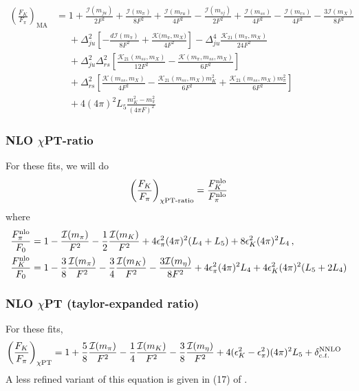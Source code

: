 \documentclass[prd,tightenlines,preprintnumbers,showpacs,superscriptaddress,notitlepage,eqsecnum,floatfix,notitlepage]{revtex4-1}
\begin{document}
\begin{align}\label{eq:fkfpi_ma}
\left(\frac{F_K}{F_\pi}\right)_\text{MA} &= 1
+\frac{\mathcal{I}(m_{ju})}{2F^2}
+\frac{\mathcal{I}(m_\pi)}{8F^2}
+\frac{\mathcal{I}(m_{ru})}{4F^2}
-\frac{\mathcal{I}(m_{sj})}{2F^2}
+\frac{\mathcal{I}(m_{ss})}{4F^2}
-\frac{\mathcal{I}(m_{rs})}{4F^2}
-\frac{3\mathcal{I}(m_X)}{8F^2}
\nonumber\\&\phantom{=}
+\Delta_{ju}^2 \left[ -\frac{d\mathcal{I}(m_\pi)}{8F^2} + \frac{\mathcal{K(}m_\pi,m_X)}{4F^2} \right]
-\Delta_{ju}^4 \frac{\mathcal{K}_{21}(m_\pi,m_X)}{24 F^2}
\nonumber\\&\phantom{=}
+\Delta_{ju}^2\Delta_{rs}^2 \left[ \frac{\mathcal{K}_{21}(m_{ss},m_X)}{12F^2}
-\frac{\mathcal{K}(m_\pi, m_{ss}, m_X)}{6F^2}
 \right]
\nonumber\\&\phantom{=}
+\Delta_{rs}^2 \left[
\frac{\mathcal{K}(m_{ss},m_X)}{4F^2}
-\frac{\mathcal{K}_{21}(m_{ss},m_X) m_K^2}{6F^2}
+\frac{\mathcal{K}_{21}(m_{ss},m_X) m_\pi^2}{6F^2}
\right]
\nonumber\\&\phantom{=}
+ 4 (4\pi)^2 L_5 \frac{m_K^2 - m_\pi^2}{(4\pi F)^2}
\end{align}

\subsubsection{NLO $\chi$PT-ratio}
For these fits, we will do
\begin{equation}
\left(\frac{F_K}{F_\pi}\right)_\text{$\chi$PT-ratio} = \frac{F_K^{\rm nlo}}{F_\pi^{\rm nlo}}
\end{equation}
where
\begin{align}
\frac{F_\pi^{\rm nlo}}{F_0} &= 1
- \frac{\mathcal{I}(m_\pi)}{F^2}
-\frac{1}{2}\frac{\mathcal{I}(m_K)}{F^2}
+4 \epsilon_\pi^2 (4\pi)^2 (L_4 + L_5)
+8 \epsilon_K^2 (4\pi)^2 L_4 \, , \\
\frac{F_K^{\rm nlo}}{F_0} &= 1
-\frac{3}{8}\frac{\mathcal{I}(m_\pi)}{F^2}
-\frac{3}{4}\frac{\mathcal{I}(m_K)}{F^2}
-\frac{3\mathcal{I}(m_\eta)}{8F^2}
+4\epsilon_\pi^2 (4 \pi)^2  L_4 + 4\epsilon_K^2 (4 \pi)^2  (L_5 + 2L_4)
\end{align}


\subsubsection{NLO $\chi$PT (taylor-expanded ratio)}
For these fits,
\begin{align}\label{eq:fkfpi_chpt}
\left(\frac{F_K}{F_\pi}\right)_\text{$\chi$PT} &= 1
+\frac{5}{8} \frac{\mathcal{I}(m_\pi)}{F^2}
-\frac{1}{4} \frac{\mathcal{I}(m_K)}{F^2}
-\frac{3}{8} \frac{\mathcal{I}(m_\eta)}{F^2}
+4(\epsilon_K^2 - \epsilon_\pi^2) (4\pi)^2 L_5
+ \delta_{c.t.}^{\rm NNLO}
\end{align}
A less refined variant of this equation is given in (17) of \cite{Berkowitz:2017opd}.
\end{document}
